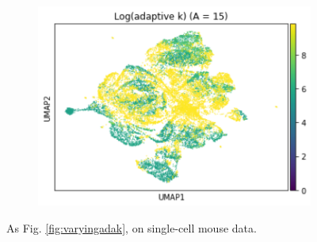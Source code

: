 \documentclass{article}
\begin{document}
\begin{figure}
\begin{subfigure}[t]{0.32\textwidth}
        \includegraphics[width=\linewidth]{figs/notMNIST/notMNIST_logadaK_Aeq15.png} %
    \end{subfigure}
    \hfill
  \caption{As Fig. \ref{fig:varyingadak}, on single-cell mouse data.}
  \label{fig:varyingadak_muris}
\end{figure}
\end{document}
